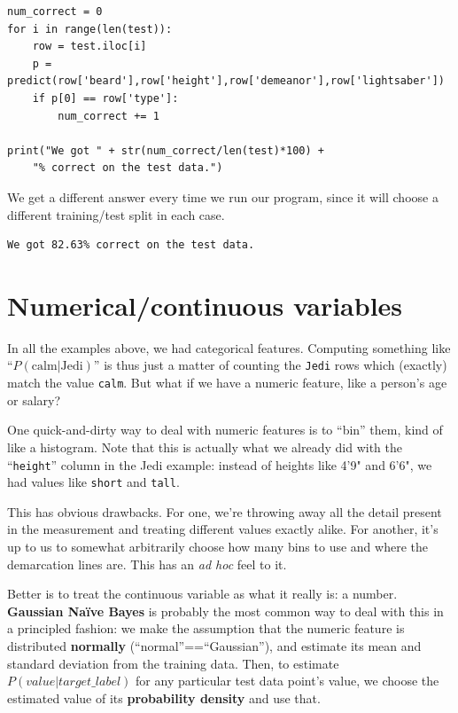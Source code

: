 \begin{Verbatim}[fontsize=\footnotesize,samepage=true,frame=single]
num_correct = 0
for i in range(len(test)):
    row = test.iloc[i]
    p = predict(row['beard'],row['height'],row['demeanor'],row['lightsaber'])
    if p[0] == row['type']:
        num_correct += 1

print("We got " + str(num_correct/len(test)*100) +  
    "% correct on the test data.")
\end{Verbatim}

We get a different answer every time we run our program, since it will choose
a different training/test split in each case.

\begin{Verbatim}[fontsize=\small,samepage=true,frame=single]
We got 82.63% correct on the test data.
\end{Verbatim}

\section{Numerical/continuous variables}

In all the examples above, we had categorical features. Computing something
like ``$P(\textrm{calm}|\textrm{Jedi})$'' is thus just a matter of counting the
\texttt{Jedi} rows which (exactly) match the value \texttt{calm}. But what if
we have a numeric feature, like a person's age or salary?

One quick-and-dirty way to deal with numeric features is to ``bin'' them, kind
of like a histogram. Note that this is actually what we already did with the
``\texttt{height}'' column in the Jedi example: instead of heights like 4'9"
and 6'6", we had values like \texttt{short} and \texttt{tall}.

This has obvious drawbacks. For one, we're throwing away all the detail
present in the measurement and treating different values exactly alike. For
another, it's up to us to somewhat arbitrarily choose how many bins to use and
where the demarcation lines are. This has an \textit{ad hoc} feel to it.

Better is to treat the continuous variable as what it really is: a number.
\textbf{Gaussian Na\"{i}ve Bayes} is probably the most common way to deal with
this in a principled fashion: we make the assumption that the numeric feature
is distributed \textbf{normally} (``normal''==``Gaussian''), and estimate its
mean and standard deviation from the training data. Then, to estimate
$P(value|target\_label)$ for any particular test data point's value, we choose
the estimated value of its \textbf{probability density} and use that.


